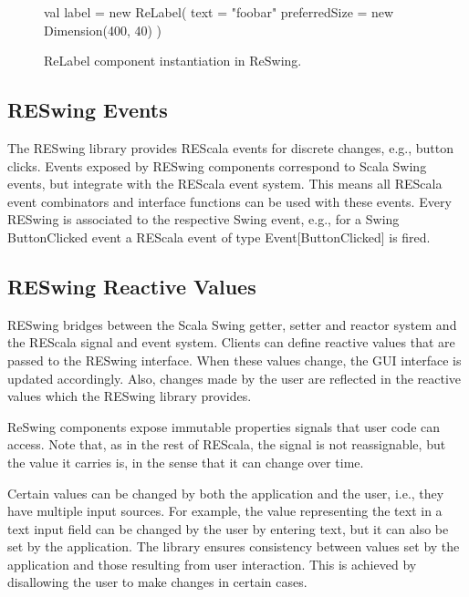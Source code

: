 \documentclass{scrartcl}
\newcommand{\code}[1]{{\fontfamily{cmtt}\small\selectfont#1}}
\begin{document}
\begin{figure}[htp]
\begin{codenv}
val label = new ReLabel(
    text = "foobar"
    preferredSize = new Dimension(400, 40)
)
\end{codenv}
\caption{ReLabel component instantiation in ReSwing.}
\label{lst:reswing-example}
\end{figure}


\subsection{RESwing Events}
\label{sec:events}
The RESwing library provides REScala events for discrete changes,
e.g., button clicks. Events exposed by RESwing components correspond
to Scala Swing events, but integrate with the REScala event system.
This means all REScala event combinators and interface functions can
be used with these events. Every RESwing is associated to the
respective Swing event, e.g., for a Swing \code{ButtonClicked} event a
REScala event of type \code{Event[ButtonClicked]} is fired.


\subsection{RESwing Reactive Values}
\label{sec:reactive-values}


RESwing bridges between the Scala Swing getter, setter and reactor
system and the REScala signal and event system. Clients can define
reactive values that are passed to the RESwing interface. When these
values change, the GUI interface is updated accordingly. Also, changes
made by the user are reflected in the reactive values which the
RESwing library provides.

ReSwing components expose immutable properties signals that user code
can access. Note that, as in the rest of REScala, the signal is not
reassignable, but the value it carries is, in the sense that it can
change over time.

Certain values can be changed by both the application and the user,
i.e., they have multiple input sources. For example, the value
representing the text in a text input field can be changed by the
user by entering text, but it can also be set by the application.
The library ensures consistency between values set by the application
and those resulting from user interaction. This is achieved by
disallowing the user to make changes in certain cases.
\end{document}
